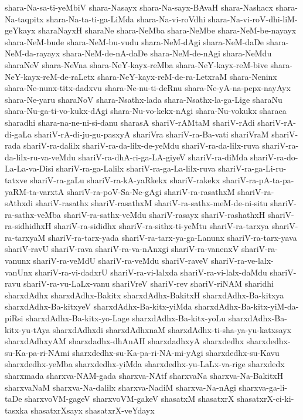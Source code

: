 {shara-Na-sa-ti-yeMbiV
shara-Nasayx
shara-Na-sayx-BAvaH
shara-Nashacx
shara-Na-taqpitx
shara-Na-ta-ti-ga-LiMda
shara-Na-vi-roVdhi
shara-Na-vi-roV-dhi-liM-geYkayx
sharaNayxH
sharaNe
shara-NeMba
shara-NeMbe
shara-NeM-be-nayayx
shara-NeM-bude
shara-NeM-bu-vudu
shara-NeM-dAgi
shara-NeM-daDe
shara-NeM-da-rayayx
shara-NeM-de-nA-daDe
shara-NeM-de-nAgi
shara-NeMdu
sharaNeV
shara-NeVna
shara-NeY-kayx-reMba
shara-NeY-kayx-reM-bive
shara-NeY-kayx-reM-de-raLetx
shara-NeY-kayx-reM-de-ra-LetxraM
shara-Neninx
shara-Ne-nunx-titx-dadxvu
shara-Ne-nu-ti-deRnu
shara-Ne-yA-na-pepx-nayAyx
shara-Ne-yaru
sharaNoV
shara-Nsathx-lada
shara-Nsathx-la-ga-Lige
sharaNu
shara-Nu-ga-ti-vo-kukx-dAgi
shara-Nu-vo-kekx-nAgi
shara-Nu-vokukx
sharaca
sharadhi
shara-na-ne-ni-si-danu
sharasA
shariV-rAMtaM
shariV-rAdi
shariV-rA-di-gaLa
shariV-rA-di-ju-gu-pasxyA
shariVra
shariV-ra-Ba-vati
shariVraM
shariV-rada
shariV-ra-dalilx
shariV-ra-da-lilx-de-yeMdu
shariV-ra-da-lilx-ruva
shariV-ra-da-lilx-ru-va-veMdu
shariV-ra-dhA-ri-ga-LA-giyeV
shariV-ra-diMda
shariV-ra-do-La-La-va-Disi
shariV-ra-ga-Lalilx
shariV-ra-ga-La-lilx-ruva
shariV-ra-ga-Li-ru-tatxve
shariV-ra-gaLu
shariV-ra-kA-yaRkekx
shariV-rakekx
shariV-ra-pA-ta-pa-yaRM-ta-varxtA
shariV-ra-poV-Sa-Ne-gAgi
shariV-ra-rasathxM
shariV-ra-sAthxdi
shariV-rasathx
shariV-rasathxM
shariV-ra-sathx-meM-de-ni-situ
shariV-ra-sathx-veMba
shariV-ra-sathx-veMdu
shariV-rasayx
shariV-rashathxH
shariV-ra-sidhidhxH
shariV-ra-sididhx
shariV-ra-sithx-ti-yeMtu
shariV-ra-tarxya
shariV-ra-tarxyaM
shariV-ra-tarx-yada
shariV-ra-tarx-ya-ga-Lanunx
shariV-ra-tarx-yava
shariV-ravU
shariV-rava
shariV-ra-va-nAnxgi
shariV-ra-vanenxV
shariV-ra-vanunx
shariV-ra-veMdU
shariV-ra-veMdu
shariV-raveV
shariV-ra-ve-lalx-vanUnx
shariV-ra-vi-dadxrU
shariV-ra-vi-lalxda
shariV-ra-vi-lalx-daMdu
shariV-ravu
shariV-ra-vu-LaLx-vanu
shariVreV
shariV-rev
shariV-riNAM
sharidhi
sharxdAdhx
sharxdAdhx-Bakitx
sharxdAdhx-BakitxH
sharxdAdhx-Ba-kitxya
sharxdAdhx-Ba-kitxyeV
sharxdAdhx-Ba-kitx-yiMda
sharxdAdhx-Ba-kitx-yiM-da-piRsi
sharxdAdhx-Ba-kitx-yo-Lage
sharxdAdhx-Ba-kitx-yoLu
sharxdAdhx-Ba-kitx-yu-tAya
sharxdAdhxdi
sharxdAdhxnaM
sharxdAdhx-ti-sha-ya-yu-katxsayx
sharxdAdhxyAM
sharxdadhx-dhAnAH
sharxdadhxyA
sharxdedhx
sharxdedhx-su-Ka-pa-ri-NAmi
sharxdedhx-su-Ka-pa-ri-NA-mi-yAgi
sharxdedhx-su-Kavu
sharxdedhx-yeMba
sharxdedhx-yiMda
sharxdedhx-yu-LaLx-va-rige
sharxdedx
sharxmada
sharxva-NAM-gada
sharxva-NAtf
sharxvaNa
sharxva-Na-BakitxH
sharxvaNaM
sharxva-Na-dalilx
sharxva-NadiM
sharxva-Na-nAgi
sharxva-ga-li-taDe
sharxvoVM-gageV
sharxvoVM-gakeV
shasatxM
shasatxrX
shasatxrX-ci-ki-tasxka
shasatxrXsayx
shasatxrX-veYdayx
}
